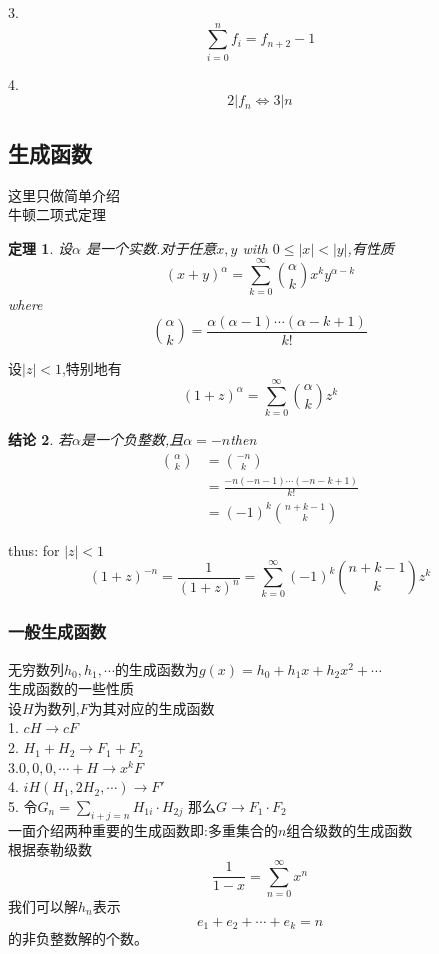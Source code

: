 \documentclass[12pt, a4paper, oneside]{ctexbook}
\newtheorem{theorem}{定理}[section]
\newtheorem{proposition}[theorem]{结论}
\begin{document}
3.
$$
\sum_{i=0}^{n} f_i=f_{n+2}-1
$$

4.
$$
2|f_n\iff3|n
$$

\subsection{生成函数}
这里只做简单介绍\\
牛顿二项式定理
\begin{theorem}
  设$\alpha$ 是一个实数.对于任意$x,y$ with $0\le |x| <|y|$,有性质
  $$
  (x+y)^{\alpha} =\sum_{k=0}^{\infty} \binom{\alpha}{k} x^{k} y^{\alpha-k}
  $$
  where
  $$
  \binom{\alpha} {k}=\frac{\alpha (\alpha-1) \cdots (\alpha -k+1)}{k!}
  $$
\end{theorem}
设$|z|<1$,特别地有
$$
(1+z)^{\alpha} =\sum_{k=0}^{\infty} \binom{\alpha}{k} z^k
$$

\begin{proposition}
  若$\alpha$是一个负整数,且$\alpha = -n$then
  $$
  \begin{aligned}
    \binom{\alpha}{k}&=\binom{-n}{k}\\
    &=\frac{-n (-n-1)\cdots (-n-k+1)}{k!}\\
    &=(-1)^k\binom{n+k-1}{k}
  \end{aligned}
  $$
\end{proposition}
thus: for $|z|<1$
$$
(1+z)^{-n}=\frac{1}{(1+z)^n}=\sum_{k=0}^{\infty}(-1)^k \binom{n+k-1}{k} z^k
$$

\subsubsection{一般生成函数}
无穷数列$h_0,h_1,\cdots $的生成函数为$g(x)=h_0+h_1 x+h_2x^2+\cdots $
\\

生成函数的一些性质\\
设$H$为数列,$F$为其对应的生成函数\\
1. $cH \rightarrow cF$\\
2. $H_1+H_2 \rightarrow F_1 +F_2$\\
3.${0,0,0,\cdots}+H \rightarrow x^kF$\\
4. $iH(H_1,2H_2,\cdots) \rightarrow F'$\\
5. 令$G_n=\sum_{i+j=n} H_{1i}\cdot H_{2j}$
那么$G\rightarrow F_1\cdot F_2$\\
一面介绍两种重要的生成函数即:多重集合的$n$组合级数的生成函数\\
根据泰勒级数
\[
\frac{1}{1-x}=\sum_{n=0}^{\infty}x^n
\]
我们可以解$h_n$表示
\[
e_1+e_2+\cdots+e_k=n
\]
的非负整数解的个数。
\end{document}
